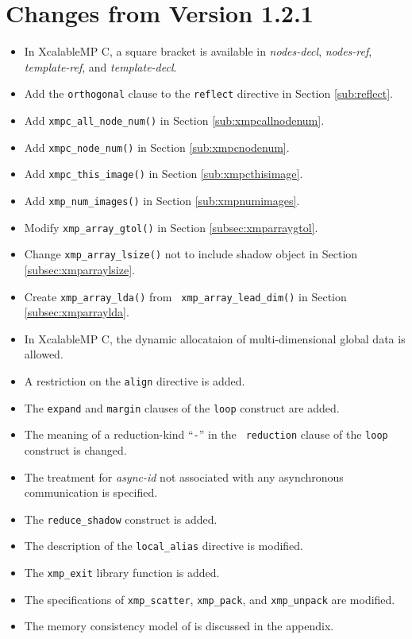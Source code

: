 \section{Changes from Version 1.2.1}
\begin{itemize}
  \item In XcalableMP C, a square bracket is available in {\it nodes-decl}, {\it nodes-ref}, 
  {\it template-ref}, and {\it template-decl}.
  \item Add the {\tt orthogonal} clause to the {\tt reflect} directive in Section \ref{sub:reflect}.
  \item Add {\tt xmpc\_all\_node\_num()} in Section \ref{sub:xmpcallnodenum}.
  \item Add {\tt xmpc\_node\_num()} in Section \ref{sub:xmpcnodenum}.
  \item Add {\tt xmpc\_this\_image()} in Section \ref{sub:xmpcthisimage}.
  \item Add {\tt xmp\_num\_images()} in Section \ref{sub:xmpnumimages}.
  \item Modify {\tt xmp\_array\_gtol()} in Section \ref{subsec:xmparraygtol}.
  \item Change {\tt xmp\_array\_lsize()} not to include shadow object in Section \ref{subsec:xmparraylsize}.
  \item Create {\tt xmp\_array\_lda()} from {\tt
		xmp\_array\_lead\_dim()} in Section \ref{subsec:xmparraylda}.

  \item In XcalableMP C, the dynamic allocataion of multi-dimensional global
		data is allowed.
  \item A restriction on the {\tt align} directive is added.
  \item The {\tt expand} and {\tt margin} clauses of the {\tt loop}
		construct are added.
  \item The meaning of a reduction-kind ``{\tt -}'' in the {\tt
		reduction} clause of the {\tt loop} construct is changed.
  \item The treatment for {\it async-id} not associated with any asynchronous
		communication is specified.
  \item The {\tt reduce\_shadow} construct is added.
  \item The description of the {\tt local\_alias} directive is modified.
  \item The {\tt xmp\_exit} library function is added.
  \item The specifications of {\tt xmp\_scatter}, {\tt xmp\_pack}, and
		{\tt xmp\_unpack} are modified.
  \item The memory consistency model of {\XMP} is discussed in the appendix.
\end{itemize}

